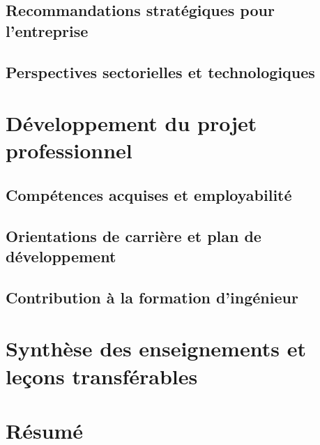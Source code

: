 \subsection{Recommandations stratégiques pour l'entreprise}
\subsection{Perspectives sectorielles et technologiques}

\section{Développement du projet professionnel}
\subsection{Compétences acquises et employabilité}
\subsection{Orientations de carrière et plan de développement}
\subsection{Contribution à la formation d'ingénieur}

\section{Synthèse des enseignements et leçons transférables}

\section{Résumé}